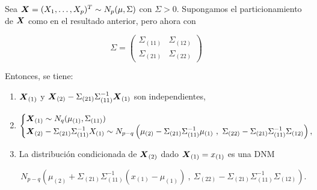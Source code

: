   \begin{nth}
    Sea $\boldsymbol{X} = (X_1, \dots, X_p)^T \sim N_p(\mu,\Sigma)$ con $\Sigma > 0$. Supongamos el particionamiento de $\boldsymbol{X}$ como en el resultado anterior, pero ahora con
    
    \[
\Sigma = \begin{pmatrix}  \Sigma_{(11)} & \Sigma_{(12)} \\ \Sigma_{(21)} & \Sigma_{(22)} \end{pmatrix}
\]

Entonces, se tiene:
\begin{enumerate}
\item $\boldsymbol{X}_{(1)}$ y $\boldsymbol{X}_{(2)} - \Sigma_{(21)} \Sigma_{(11)}^{-1}\boldsymbol{X}_{(1)}$ son independientes, \label{indepitem}
\item \[
  \begin{cases}
    \vectX_{(1)} \sim N_q(\mu_{(1)}, \Sigma_{(11)}) \\
    \vectX_{(2)} - \Sigma_{(21)} \Sigma_{(11)}^{-1}X_{(1)} \sim N_{p-q}\left(\mu_{(2)} - \Sigma_{(21)}\Sigma_{(11)}^{-1}\mu_{(1)} \ , \ \Sigma_{(22)} - \Sigma_{(21)} \Sigma_{(11)}^{-1} \Sigma_{(12)}\right)
  ,\end{cases}
  \] \label{distitem}
  
\item La distribución condicionada de $\boldsymbol{X}_{(2)}$ dado $\boldsymbol{X}_{(1)} = x_{(1)}$ es una DNM
  
  \[
    N_{p-q}\left(\mu_{(2)} + \Sigma_{(21)}\Sigma_{(11)}^{-1}(x_{(1)} - \mu_{(1)}) \ , \ \Sigma_{(22)} - \Sigma_{(21)} \Sigma_{(11)}^{-1} \Sigma_{(12)}\right)
  .\] \label{conditem}
  
\end{enumerate}
  \end{nth}
